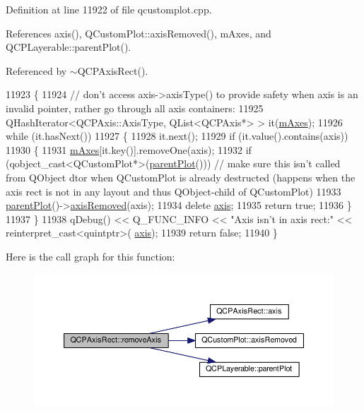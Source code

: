 Definition at line 11922 of file qcustomplot.\+cpp.



References axis(), Q\+Custom\+Plot\+::axis\+Removed(), m\+Axes, and Q\+C\+P\+Layerable\+::parent\+Plot().



Referenced by $\sim$\+Q\+C\+P\+Axis\+Rect().


\begin{DoxyCode}
11923 \{
11924   \textcolor{comment}{// don't access axis->axisType() to provide safety when axis is an invalid pointer, rather go through all
       axis containers:}
11925   QHashIterator<QCPAxis::AxisType, QList<QCPAxis*> > it(\hyperlink{class_q_c_p_axis_rect_afe7a24d2a2bea98fc552fa826350ba81}{mAxes});
11926   \textcolor{keywordflow}{while} (it.hasNext())
11927   \{
11928     it.next();
11929     \textcolor{keywordflow}{if} (it.value().contains(axis))
11930     \{
11931       \hyperlink{class_q_c_p_axis_rect_afe7a24d2a2bea98fc552fa826350ba81}{mAxes}[it.key()].removeOne(axis);
11932       \textcolor{keywordflow}{if} (qobject\_cast<QCustomPlot*>(\hyperlink{class_q_c_p_layerable_ab7e0e94461566093d36ffc0f5312b109}{parentPlot}())) \textcolor{comment}{// make sure this isn't called from QObject
       dtor when QCustomPlot is already destructed (happens when the axis rect is not in any layout and thus
       QObject-child of QCustomPlot)}
11933         \hyperlink{class_q_c_p_layerable_ab7e0e94461566093d36ffc0f5312b109}{parentPlot}()->\hyperlink{class_q_custom_plot_a8b46607021c463c94709d3504951cb47}{axisRemoved}(axis);
11934       \textcolor{keyword}{delete} \hyperlink{class_q_c_p_axis_rect_a560de44e47a4af0f86c59102a094b1e4}{axis};
11935       \textcolor{keywordflow}{return} \textcolor{keyword}{true};
11936     \}
11937   \}
11938   qDebug() << Q\_FUNC\_INFO << \textcolor{stringliteral}{"Axis isn't in axis rect:"} << \textcolor{keyword}{reinterpret\_cast<}quintptr\textcolor{keyword}{>}(
      \hyperlink{class_q_c_p_axis_rect_a560de44e47a4af0f86c59102a094b1e4}{axis});
11939   \textcolor{keywordflow}{return} \textcolor{keyword}{false};
11940 \}
\end{DoxyCode}


Here is the call graph for this function\+:\nopagebreak
\begin{figure}[H]
\begin{center}
\leavevmode
\includegraphics[width=350pt]{class_q_c_p_axis_rect_a03c39cd9704f0d36fb6cf980cdddcbaa_cgraph}
\end{center}
\end{figure}




